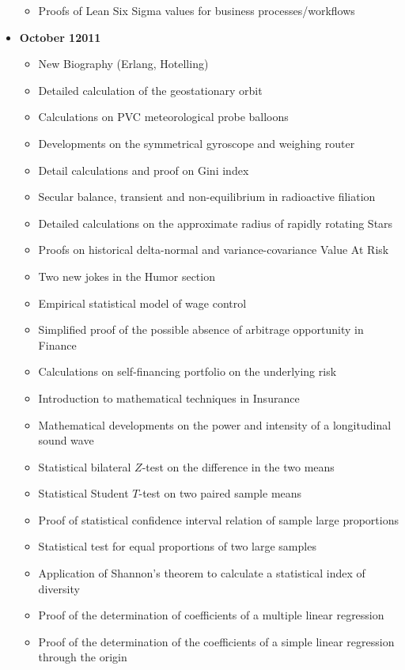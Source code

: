 \begin{itemize}
\begin{itemize}[noitemsep]
			\item Proofs of Lean Six Sigma values for business processes/workflows
		\end{itemize}
	\item \textbf{October 12011}
		\begin{itemize}[noitemsep]
			\item New Biography (Erlang, Hotelling)
			\item Detailed calculation of the geostationary orbit
			\item Calculations on PVC meteorological probe balloons
			\item Developments on the symmetrical gyroscope and weighing router
			\item Detail calculations and proof on Gini index
			\item Secular balance, transient and non-equilibrium in radioactive filiation
			\item Detailed calculations on the approximate radius of rapidly rotating Stars
			\item Proofs on historical delta-normal and variance-covariance Value At Risk
			\item Two new jokes in the Humor section
			\item Empirical statistical model of wage control
			\item Simplified proof of the possible absence of arbitrage opportunity in Finance
			\item Calculations on self-financing portfolio on the underlying risk
			\item Introduction to mathematical techniques in Insurance
			\item Mathematical developments on the power and intensity of a longitudinal sound wave
			\item Statistical bilateral $Z$-test on the difference in the two means
			\item Statistical Student $T$-test on two paired sample means
			\item Proof of statistical confidence interval relation of sample large proportions
			\item Statistical test for equal proportions of two large samples
			\item Application of Shannon's theorem to calculate a statistical index of diversity
			\item Proof of the determination of coefficients of a multiple linear regression
			\item Proof of the determination of the coefficients of a simple linear regression through the origin

\end{itemize}
\end{itemize}
